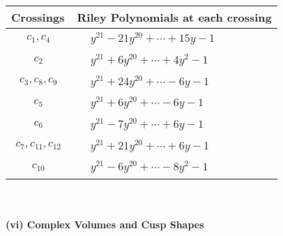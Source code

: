 \documentclass[1p]{elsarticle_modified}
\theoremstyle{definition}
\begin{document}
\begin{tabular}{m{50pt}|m{274pt}}
Crossings & \hspace{64pt}Riley Polynomials at each crossing \\
\hline $$\begin{aligned}c_{1},c_{4}\end{aligned}$$&$\begin{aligned}
&y^{21}-21 y^{20}+\cdots+15 y-1
\end{aligned}$\\
\hline $$\begin{aligned}c_{2}\end{aligned}$$&$\begin{aligned}
&y^{21}+6 y^{20}+\cdots+4 y^2-1
\end{aligned}$\\
\hline $$\begin{aligned}c_{3},c_{8},c_{9}\end{aligned}$$&$\begin{aligned}
&y^{21}+24 y^{20}+\cdots-6 y-1
\end{aligned}$\\
\hline $$\begin{aligned}c_{5}\end{aligned}$$&$\begin{aligned}
&y^{21}+6 y^{20}+\cdots-6 y-1
\end{aligned}$\\
\hline $$\begin{aligned}c_{6}\end{aligned}$$&$\begin{aligned}
&y^{21}-7 y^{20}+\cdots+6 y-1
\end{aligned}$\\
\hline $$\begin{aligned}c_{7},c_{11},c_{12}\end{aligned}$$&$\begin{aligned}
&y^{21}+21 y^{20}+\cdots+6 y-1
\end{aligned}$\\
\hline $$\begin{aligned}c_{10}\end{aligned}$$&$\begin{aligned}
&y^{21}-6 y^{20}+\cdots-8 y^2-1
\end{aligned}$\\
\hline
\end{tabular}\\~\\
\newpage\flushleft \textbf{(vi) Complex Volumes and Cusp Shapes}
\end{document}

